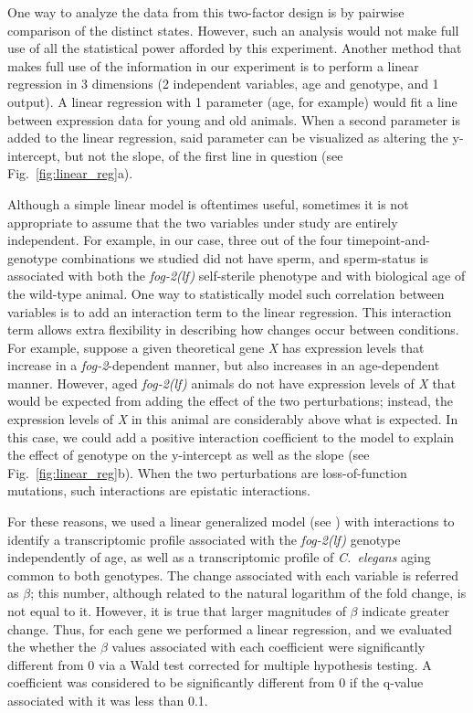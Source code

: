 \documentclass[9pt,twocolumn,twoside]{gsajnl}
\newcommand{\cel}{\emph{C.~elegans}}
\newcommand{\fog}{\emph{\mbox{fog-2(lf)}}}
\newcommand{\gene}[1]{\emph{\mbox{#1}}}
\begin{document}
One way to analyze the data from this two-factor design is by pairwise
comparison of the distinct states. However, such an analysis would not make full
use of all the statistical power afforded by this experiment. Another method
that makes full use of the information in our experiment is to perform a linear
regression in 3 dimensions (2 independent variables, age and genotype, and 1
output). A linear regression with 1 parameter (age, for example) would fit a
line between expression data for young and old animals. When a second parameter
is added to the linear regression, said parameter can be visualized as altering
the y-intercept, but not the slope, of the first line in question (see
Fig.~\ref{fig:linear_reg}a).

Although a simple linear model is oftentimes useful, sometimes it is not
appropriate to assume that the two variables under study are entirely
independent. For example, in our case, three out of the four timepoint-and-genotype
combinations we studied did not have sperm, and sperm-status is
associated with both the \fog{} self-sterile phenotype and with biological age
of the wild-type animal. One way to statistically model such correlation between
variables is to add an interaction term to the linear regression.
This interaction term allows extra flexibility in describing how changes occur
between conditions.
For example, suppose a given theoretical gene \gene{X} has expression levels that
increase in a \gene{fog-2}-dependent manner, but also increases in an
age-dependent manner. However, aged \fog{} animals do not have expression levels
of \gene{X} that would be expected from adding the effect of the two perturbations;
instead, the expression levels of \gene{X} in this animal are considerably above
what is expected. In this case, we could add a positive
interaction coefficient to the model to explain the effect of genotype on the
y-intercept as well as the slope (see Fig.~\ref{fig:linear_reg}b).
When the two
perturbations are loss-of-function mutations, such interactions are epistatic
interactions.

For these reasons, we used a linear generalized model (see )
with interactions to identify a transcriptomic profile associated with the
\fog{} genotype independently of age, as well as a transcriptomic profile of
\cel{} aging common to both genotypes. The change associated with each variable
is referred as $\beta$; this number, although related to the natural logarithm
of the fold change, is not equal to it. However, it is true that larger
magnitudes of $\beta$ indicate greater change. Thus, for each gene we performed
a linear regression, and we evaluated the whether the $\beta$ values associated
with each coefficient were significantly different from 0 via a Wald test
corrected for multiple hypothesis testing. A coefficient was considered to be
significantly different from 0 if the q-value associated with it was less than
0.1.
\end{document}
